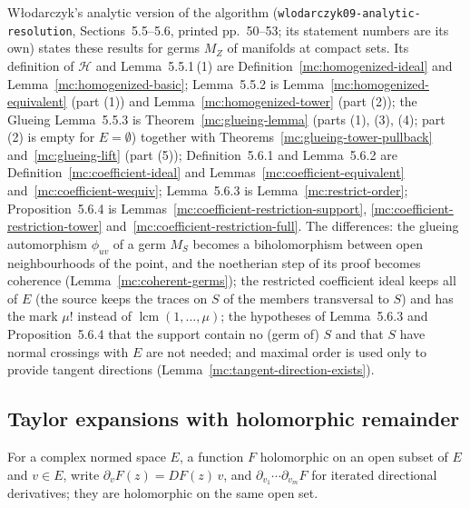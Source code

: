 Włodarczyk's analytic version of the algorithm (\texttt{wlodarczyk09-analytic-resolution}, Sections~5.5--5.6, printed pp.~50--53; its statement
numbers are its own) states these results for germs \(M_Z\) of manifolds at compact sets. Its definition of \(\mathcal H\) and Lemma~5.5.1\,(1) are
Definition~\ref{mc:homogenized-ideal} and Lemma~\ref{mc:homogenized-basic}; Lemma~5.5.2 is Lemma~\ref{mc:homogenized-equivalent} (part (1)) and
Lemma~\ref{mc:homogenized-tower} (part (2)); the Glueing Lemma~5.5.3 is Theorem~\ref{mc:glueing-lemma} (parts (1), (3), (4); part (2) is empty for
\(E=\emptyset\)) together with Theorems~\ref{mc:glueing-tower-pullback} and~\ref{mc:glueing-lift} (part (5)); Definition~5.6.1 and Lemma~5.6.2 are
Definition~\ref{mc:coefficient-ideal} and Lemmas~\ref{mc:coefficient-equivalent} and~\ref{mc:coefficient-wequiv}; Lemma~5.6.3 is Lemma~\ref{mc:restrict-order};
Proposition~5.6.4 is Lemmas~\ref{mc:coefficient-restriction-support}, \ref{mc:coefficient-restriction-tower} and~\ref{mc:coefficient-restriction-full}. The
differences: the glueing automorphism \(\phi_{uv}\) of a germ \(M_S\) becomes a biholomorphism between open neighbourhoods of the point, and the
noetherian step of its proof becomes coherence (Lemma~\ref{mc:coherent-germs}); the restricted coefficient ideal keeps all of \(E\) (the source keeps the
traces on \(S\) of the members transversal to \(S\)) and has the mark \(\mu!\) instead of \(\operatorname{lcm}(1,\dots,\mu)\); the hypotheses of
Lemma~5.6.3 and Proposition~5.6.4 that the support contain no (germ of) \(S\) and that \(S\) have normal crossings with \(E\) are not needed; and maximal
order is used only to provide tangent directions (Lemma~\ref{mc:tangent-direction-exists}).

\subsection{Taylor expansions with holomorphic remainder}

For a complex normed space \(E\), a function \(F\) holomorphic on an open subset of \(E\) and \(v\in E\), write
\(\partial_vF(z)=DF(z)\,v\), and \(\partial_{v_1}\cdots\partial_{v_m}F\) for iterated directional derivatives; they are
holomorphic on the same open set.

